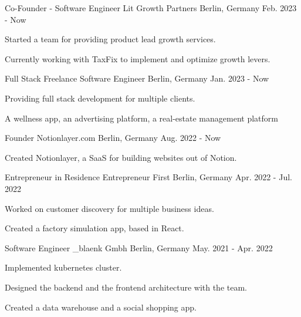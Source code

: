 


\begin{cventries}

\cventry
{Co-Founder - Software Engineer}
{Lit Growth Partners}
{Berlin, Germany}
{Feb. 2023 - Now}
{
  \begin{cvitems}
    \item {Started a team for providing product lead growth services.}
    \item {Currently working with TaxFix to implement and optimize growth levers.}
  \end{cvitems}
}

\cventry
{Full Stack}
{Freelance Software Engineer}
{Berlin, Germany}
{Jan. 2023 - Now}
{
  \begin{cvitems}
    \item {Providing full stack development for multiple clients.}
    \item {A wellness app, an advertising platform, a real-estate management platform}
  \end{cvitems}
}

\cventry
{Founder}
{Notionlayer.com}
{Berlin, Germany}
{Aug. 2022 - Now}
{
  \begin{cvitems}
    \item {Created Notionlayer, a SaaS for building websites out of Notion.}
  \end{cvitems}
}


\cventry
{Entrepreneur in Residence}
{Entrepreneur First}
{Berlin, Germany}
{Apr. 2022 - Jul. 2022}
{
  \begin{cvitems}
    \item {Worked on customer discovery for multiple business ideas.}
    \item {Created a factory simulation app, based in React.}
  \end{cvitems}
}


\cventry
{Software Engineer}
{\_blaenk Gmbh}
{Berlin, Germany}
{May. 2021 - Apr. 2022}
{
  \begin{cvitems}
    \item {Implemented kubernetes cluster.}
    \item {Designed the backend and the frontend architecture with the team.}
    \item {Created a data warehouse and a social shopping app.}
  \end{cvitems}
}


\end{cventries}
